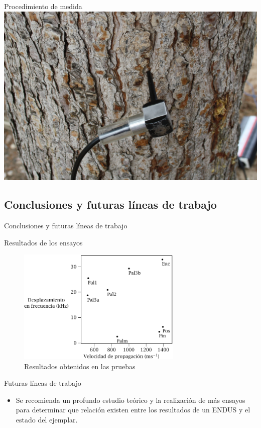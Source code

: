 \documentclass[utf8, compress]			{beamer}
\begin{document}
\begin{frame}{Procedimiento de medida}
    \hspace{1.5em}
    \includegraphics{mpino.jpg}
\end{frame}


\subsection{Conclusiones y futuras líneas de trabajo}

\begin{frame}{Conclusiones y futuras líneas de trabajo}
    \tableofcontents[currentsubsection]
\end{frame}

\begin{frame}{Resultados de los ensayos}
    \begin{figure}
	\includegraphics[height=55mm, keepaspectratio]{resultados.pdf}
	\caption{Resultados obtenidos en las pruebas}
	\label{fig:results}
    \end{figure}
\end{frame}

\begin{frame}{Futuras líneas de trabajo}
    \begin{itemize}
	\item Se recomienda un profundo estudio teórico y la
	    realización de más ensayos para determinar que relación
	    existen entre los resultados de un ENDUS y el estado
	    del ejemplar.
    \end{itemize}
\end{frame}
\end{document}
